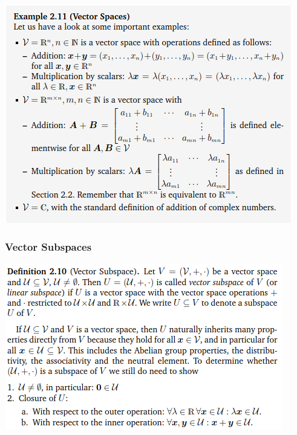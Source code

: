 \documentclass[oneside,10pt]{scrartcl}
\begin{document}
\begin{multicols*}{2}
\includegraphics[width=\linewidth]{2.4_3}

\subsubsection*{Vector Subspaces}
\includegraphics[width=\linewidth]{2.4_4}


\end{multicols*}
\end{document}
